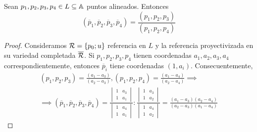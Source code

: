 \begin{prop}
  Sean $p_1, p_2, p_3, p_4 \in L \subseteq \mathbb{A}$ puntos alineados. Entonces
  \[(\overline{p}_1, \overline{p}_2, \overline{p}_3, \overline{p}_4) = 
  \frac{(p_1, p_2, p_3)}{(p_1, p_2, p_4)}\]
\end{prop}
\begin{proof}
  Consideramos $\mathcal{R} = \{p_0; u\}$ referencia en $L$ y la referencia proyectivizada
  en su variedad completada $\overline{\mathcal{R}}$. Si $p_1, p_2, p_3, p_4$ tienen coordenadas
  $a_1, a_2, a_3, a_4$ correspondientemente, entonces $\overline{p}_i$ tiene coordenadas
  $(1, a_i)$. Consecuentemente,
  \begin{gather*} 
    (p_1, p_2, p_3) =\frac{(a_1-a_3)}{(a_2-a_3)},
 (p_1, p_2, p_4) =\frac{(a_1-a_4)}{(a_2-a_4)} \implies \\
 \implies 
     (\overline{p}_1, \overline{p}_2, \overline{p}_3, \overline{p}_4) =
    \frac{
        \begin{vmatrix}
          1 & a_3 \\ 1 & a_1 
        \end{vmatrix}
      }
      {
        \begin{vmatrix}
        1 & a_4\\
        1 & a_1
    \end{vmatrix}
  }
    :
    \frac{
        \begin{vmatrix}
          1 & a_3 \\ 1 & a_2 
        \end{vmatrix}
      }
      {
        \begin{vmatrix}
        1 & a_4 \\
        1 & a_2
    \end{vmatrix}
  }
  = \frac{(a_1-a_3)(a_2-a_4)}{(a_2-a_3)(a_1-a_4)}
\end{gather*}
\end{proof}
